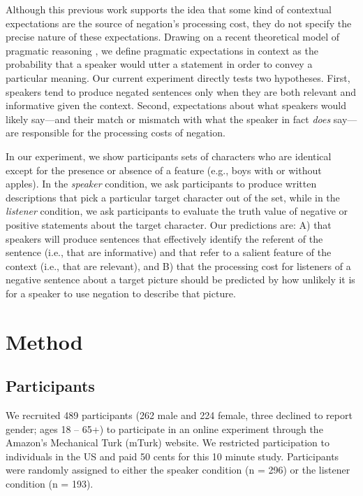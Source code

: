 \documentclass[man, noapacite]{apa2}
\begin{document}
Although this previous work supports the idea that some kind of contextual expectations are the source of negation's processing cost, they do not specify the precise nature of these expectations. Drawing on a recent theoretical model of pragmatic reasoning \cite{frank2012}, we define pragmatic expectations in context as the probability that a speaker would utter a statement in order to convey a particular meaning. Our current experiment directly tests two hypotheses.  First, speakers tend to produce negated sentences only when they are both relevant and informative given the context.  Second, expectations about what speakers would likely say---and their match or mismatch with what the speaker in fact \emph{does} say---are responsible for the processing costs of negation. 

In our experiment, we show participants sets of characters who are identical except for the presence or absence of a feature (e.g., boys with or without apples). In the \emph{speaker} condition, we ask participants to produce written descriptions that pick a particular target character out of the set, while in the \emph{listener} condition, we ask participants to evaluate the truth value of negative or positive statements about the target character. Our predictions are: A) that speakers will produce sentences that effectively identify the referent of the sentence (i.e., that are informative) and that refer to a salient feature of the context (i.e., that are relevant), and B) that the processing cost for listeners of a negative sentence about a target picture should be predicted by how unlikely it is for a speaker to use negation to describe that picture.

\section{Method}

\subsection{Participants} 

We recruited 489 participants (262 male and 224 female, three declined to report gender; ages 18 -- 65+) to participate in an online experiment through the Amazon's Mechanical Turk (mTurk) website.  We restricted participation to individuals in the US and paid 50 cents for this 10 minute study.  Participants were randomly assigned to either the speaker condition (n = 296) or the listener condition (n = 193).
\end{document}
